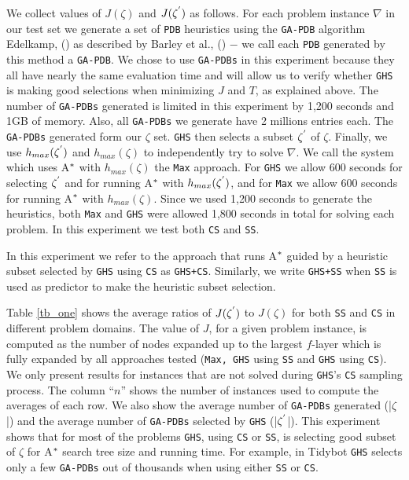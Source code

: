 We collect values of $J(\zeta)$ and $J(\zeta\sp{'})$ as follows. For each problem instance $\nabla$ in our test set we generate a set of \texttt{PDB} heuristics using the \texttt{GA-PDB} algorithm Edelkamp, (\citeyear{edelkamp2007automated}) as described by Barley et al., (\citeyear{BarleySantiagoOver}) $-$ we call each \texttt{PDB} generated by this method a \texttt{GA-PDB}. We chose to use \texttt{GA-PDBs} in this experiment because they all have nearly the same evaluation time and will allow us to verify whether \texttt{GHS} is making good selections when minimizing $J$ and $T$, as explained above. The number of \texttt{GA-PDBs} generated is limited in this experiment by 1,200 seconds and 1GB of memory. Also, all \texttt{GA-PDBs} we generate have 2 millions entries each. The \texttt{GA-PDBs} generated form our $\zeta$ set. \texttt{GHS} then selects a subset $\zeta\sp{'}$ of $\zeta$. Finally, we use $h_{max}(\zeta\sp{'})$ and $h_{max}(\zeta)$ to independently try to solve $\nabla$. We call the system which uses A$\sp{*}$ with $h_{max}(\zeta)$ the \texttt{Max} approach. For \texttt{GHS} we allow 600 seconds for selecting $\zeta\sp{'}$ and for running A$\sp{*}$ with $h_{max}(\zeta\sp{'})$, and for \texttt{Max} we allow 600 seconds for running A$\sp{*}$ with $h_{max}(\zeta)$. Since we used 1,200 seconds to generate the heuristics, both \texttt{Max} and \texttt{GHS} were allowed 1,800 seconds in total for solving each problem. In this experiment we test both \texttt{CS} and \texttt{SS}.

In this experiment we refer to the approach that runs A$\sp{*}$ guided by a heuristic subset selected by \texttt{GHS} using \texttt{CS} as \texttt{GHS+CS}. Similarly, we write \texttt{GHS+SS} when \texttt{SS} is used as predictor to make the heuristic subset selection.

Table \ref{tb_one} shows the average ratios of $J(\zeta\sp{'})$ to $J(\zeta)$ for both \texttt{SS} and \texttt{CS} in different problem domains. The value of $J$, for a given problem instance, is computed as the number of nodes expanded up to the largest $f$-layer which is fully expanded by all approaches tested (\texttt{Max, GHS} using \texttt{SS} and \texttt{GHS} using \texttt{CS}). We only present results for instances that are not solved during \texttt{GHS}'s \texttt{CS} sampling process. The column ``$n$'' shows the number of instances used to compute the averages of each row. We also show the average number of \texttt{GA-PDBs} generated (|$\zeta$|) and the average number of \texttt{GA-PDBs} selected by \texttt{GHS} (|$\zeta\sp{'}$|). This experiment shows that for most of the problems \texttt{GHS}, using \texttt{CS} or \texttt{SS}, is selecting good subset of $\zeta$ for A$\sp{*}$ search tree size and running time. For example, in Tidybot \texttt{GHS} selects only a few \texttt{GA-PDBs} out of thousands when using either \texttt{SS} or \texttt{CS}.


